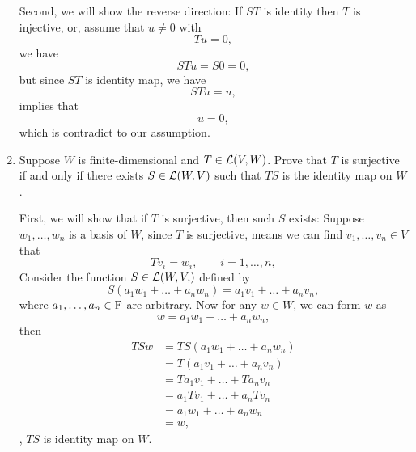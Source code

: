 \begin{enumerate}
\begin{solution}
            Second, we will show the reverse direction: If $ST$ is identity then $T$ is injective, or, assume that $u \neq 0$ with 
            \[ Tu = 0, \]
            we have 
            \[ STu = S0 = 0,\]
            but since $ST$ is identity map, we have 
            \[ STu = u,\]
            implies that
            \[ u = 0, \]
            which is contradict to our assumption.
        \end{solution}
    \item Suppose $W$ is finite-dimensional and $T \in \mathcal{L}(V, W)$. Prove that $T$ is surjective if and only if there exists $S \in \mathcal{L}(W, V)$ 
        such that $TS$ is the identity map on $W$.
        \begin{solution}
            First, we will show that if $T$ is surjective, then such $S$ exists: Suppose $w_1, \ldots, w_n$ is a basis of $W$, since $T$ is surjective, 
            means we can find $v_1, \ldots, v_n \in V$ that 
            \[ Tv_i = w_i, \qquad i=1, \ldots, n,\]
            Consider the function $S \in \lmap{W, V}$ defined by 
            \[ S(a_1w_1 + \dots + a_nw_n) = a_1v_1 + \dots + a_nv_n ,\]
            where $a_1, \ldots, a_n \in \mathrm{F}$ are arbitrary. Now for any $w \in W$, we can form $w$ as 
            \[ w = a_1w_1 + \dots + a_nw_n,\]
            then 
            \begin{align*}
                TSw &= TS(a_1w_1 + \dots + a_nw_n) \\
                    &= T(a_1v_1 + \dots + a_nv_n) \\
                    &= Ta_1v_1 + \dots + Ta_nv_n \\
                    &= a_1Tv_1 + \dots + a_nTv_n \\
                    &= a_1w_1 + \dots + a_nw_n \\
                    &= w,
            \end{align*}
            \ie, $TS$ is identity map on $W$.


\end{solution}
\end{enumerate}
